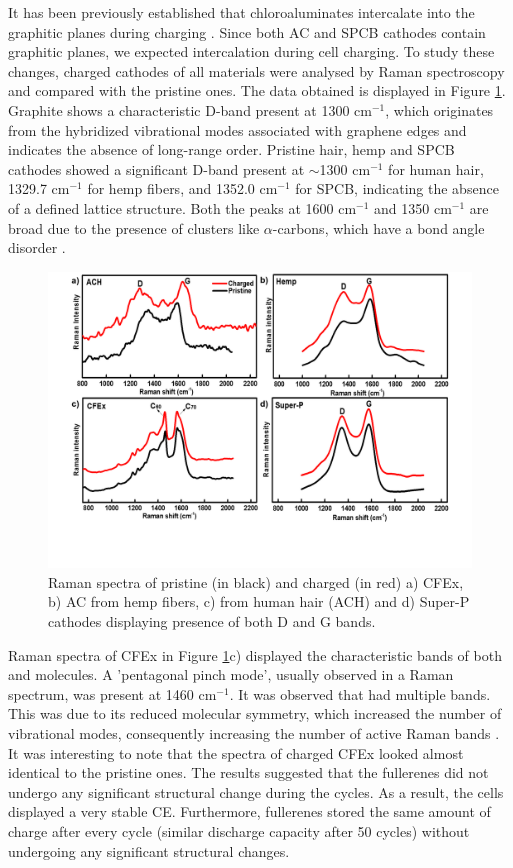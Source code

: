 \documentclass{article}
\begin{document}
It has been previously established that chloroaluminates intercalate into the graphitic planes during charging \cite{lin_ultrafast_2015-2}. Since both AC and SPCB cathodes contain graphitic planes, we expected intercalation during cell charging. To study these changes, charged cathodes of all materials were analysed by Raman spectroscopy and compared with the pristine ones. The data obtained is displayed in Figure \ref{fig:raman}. Graphite shows a characteristic D-band present at 1300 cm$^{-1}$, which originates from the hybridized vibrational modes associated with graphene edges and indicates the absence of long-range order. Pristine hair, hemp and SPCB cathodes showed a significant D-band present at $\sim$1300 cm$^{-1}$ for human hair, 1329.7 cm$^{-1}$ for hemp fibers, and 1352.0 cm$^{-1}$ for SPCB, indicating the absence of a defined lattice structure. Both the peaks at 1600 cm$^{-1}$ and 1350 cm$^{-1}$ are broad due to the presence of  clusters like $\alpha$-carbons, which have a bond angle disorder \cite{shimodaira_raman_2002}.

 \begin{figure}
  \centering
  \includegraphics[width=\textwidth]{fig/raman}
    \caption{Raman spectra of pristine (in black) and charged (in red) a) CFEx, b) AC from hemp fibers, c) from human hair (ACH) and d) Super-P cathodes displaying presence of both D and G bands.}
  \label{fig:raman}
\end{figure}

Raman spectra of CFEx in Figure \ref{fig:raman}c) displayed the characteristic bands of both  and  molecules. A 'pentagonal pinch mode', usually observed in a  Raman spectrum, was present at 1460 cm$^{-1}$. It was observed that  had multiple bands. This was due to its reduced molecular symmetry, which increased the number of vibrational modes, consequently increasing the number of active Raman bands \cite{kimbrell_analysis_2014}. It was interesting to note that the spectra of charged CFEx looked almost identical to the pristine ones. The results suggested that the fullerenes did not undergo any significant structural change during the cycles. As a result, the cells displayed a very stable CE. Furthermore, fullerenes stored the same amount of charge after every cycle (similar discharge capacity after 50 cycles) without undergoing any significant structural changes.
\end{document}
